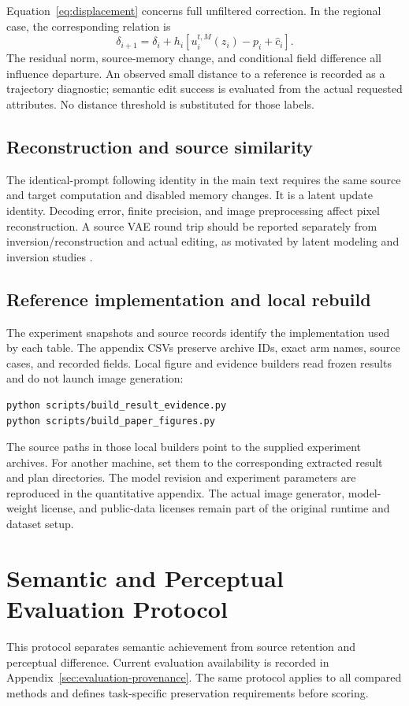 \documentclass[conference]{IEEEtran}
\begin{document}
Equation~\eqref{eq:displacement} concerns full unfiltered correction. In the regional case, the corresponding relation is
\begin{equation}
\delta_{i+1}=\delta_i+h_i[u_i^{t,M}(z_i)-p_i+\widehat c_i].
\end{equation}
The residual norm, source-memory change, and conditional field difference all influence departure. An observed small distance to a reference is recorded as a trajectory diagnostic; semantic edit success is evaluated from the actual requested attributes. No distance threshold is substituted for those labels.

\subsection{Reconstruction and source similarity}
The identical-prompt following identity in the main text requires the same source and target computation and disabled memory changes. It is a latent update identity. Decoding error, finite precision, and image preprocessing affect pixel reconstruction. A source VAE round trip should be reported separately from inversion/reconstruction and actual editing, as motivated by latent modeling and inversion studies \cite{rombach2022ldm,mokady2023nulltext,wallace2023edict}.

\subsection{Reference implementation and local rebuild}
The experiment snapshots and source records identify the implementation used by each table. The appendix CSVs preserve archive IDs, exact arm names, source cases, and recorded fields. Local figure and evidence builders read frozen results and do not launch image generation:
\begin{verbatim}
python scripts/build_result_evidence.py
python scripts/build_paper_figures.py
\end{verbatim}
The source paths in those local builders point to the supplied experiment archives. For another machine, set them to the corresponding extracted result and plan directories. The model revision and experiment parameters are reproduced in the quantitative appendix. The actual image generator, model-weight license, and public-data licenses remain part of the original runtime and dataset setup.

\section{Semantic and Perceptual Evaluation Protocol}
\label{sec:review-protocol}
This protocol separates semantic achievement from source retention and perceptual difference. Current evaluation availability is recorded in Appendix~\ref{sec:evaluation-provenance}. The same protocol applies to all compared methods and defines task-specific preservation requirements before scoring.
\end{document}
